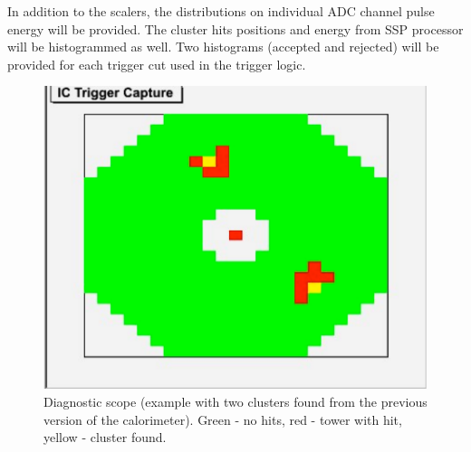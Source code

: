 In addition to the scalers, the distributions on individual ADC channel pulse energy will be provided.
The cluster hits positions and energy from SSP processor will be histogrammed as well. Two histograms (accepted and rejected) will be provided for each trigger cut used in the trigger logic.



\begin{figure}[t]
\includegraphics[scale=0.8]{daq_trigger/figures/dvcs_2_cluster}
\caption{\small{Diagnostic scope (example with two clusters found from the previous version of the calorimeter). Green - no hits, red - tower with hit, yellow - cluster found.}}
\label{fig:dvcs_2_cluster}
\end{figure}





